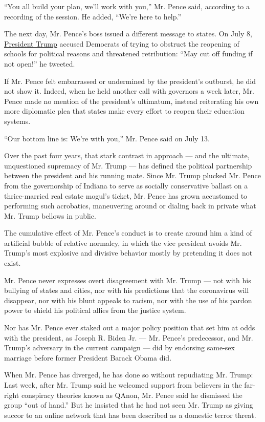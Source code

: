 ``You all build your plan, we'll work with you,'' Mr. Pence said,
according to a recording of the session. He added, ``We're here to
help.''

The next day, Mr. Pence's boss issued a different message to states. On
July 8,
\href{https://www.nytimes3xbfgragh.onion/2020/08/26/us/politics/trump-convention-night-2.html}{President
Trump} accused Democrats of trying to obstruct the reopening of schools
for political reasons and threatened retribution: ``May cut off funding
if not open!'' he tweeted.

If Mr. Pence felt embarrassed or undermined by the president's outburst,
he did not show it. Indeed, when he held another call with governors a
week later, Mr. Pence made no mention of the president's ultimatum,
instead reiterating his own more diplomatic plea that states make every
effort to reopen their education systems.

``Our bottom line is: We're with you,'' Mr. Pence said on July 13.

Over the past four years, that stark contrast in approach --- and the
ultimate, unquestioned supremacy of Mr. Trump --- has defined the
political partnership between the president and his running mate. Since
Mr. Trump plucked Mr. Pence from the governorship of Indiana to serve as
socially conservative ballast on a thrice-married real estate mogul's
ticket, Mr. Pence has grown accustomed to performing such acrobatics,
maneuvering around or dialing back in private what Mr. Trump bellows in
public.

The cumulative effect of Mr. Pence's conduct is to create around him a
kind of artificial bubble of relative normalcy, in which the vice
president avoids Mr. Trump's most explosive and divisive behavior mostly
by pretending it does not exist.

Mr. Pence never expresses overt disagreement with Mr. Trump --- not with
his bullying of states and cities, nor with his predictions that the
coronavirus will disappear, nor with his blunt appeals to racism, nor
with the use of his pardon power to shield his political allies from the
justice system.

Nor has Mr. Pence ever staked out a major policy position that set him
at odds with the president, as Joseph R. Biden Jr. --- Mr. Pence's
predecessor, and Mr. Trump's adversary in the current campaign --- did
by endorsing same-sex marriage before former President Barack Obama did.

When Mr. Pence has diverged, he has done so without repudiating Mr.
Trump: Last week, after Mr. Trump said he welcomed support from
believers in the far-right conspiracy theories known as QAnon, Mr. Pence
said he dismissed the group ``out of hand.'' But he insisted that he had
not seen Mr. Trump as giving succor to an online network that has been
described as a domestic terror threat.

